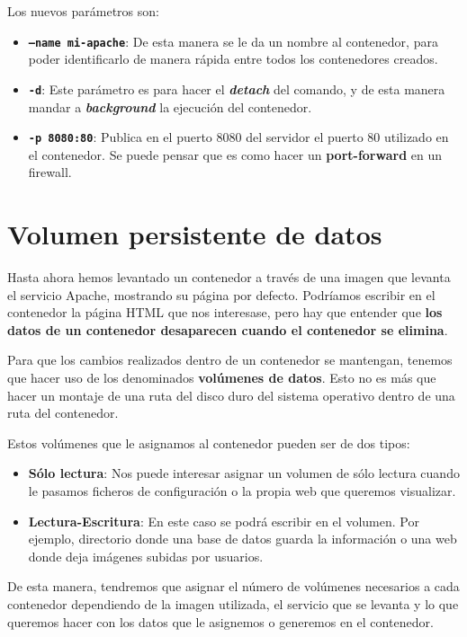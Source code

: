 Los nuevos parámetros son:
\begin{itemize}
    \item \textbf{\texttt{--name mi-apache}}: De esta manera se le da un nombre al contenedor, para poder identificarlo de manera rápida entre todos los contenedores creados.
    \item \textbf{\texttt{-d}}: Este parámetro es para hacer el \textbf{\textit{detach}} del comando, y de esta manera mandar a \textbf{\textit{background}} la ejecución del contenedor.
    \item \textbf{\texttt{-p 8080:80}}: Publica en el puerto 8080 del servidor el puerto 80 utilizado en el contenedor. Se puede pensar que es como hacer un \textbf{port-forward} en un firewall.
\end{itemize}


\hypertarget{volumen_persistente_datos}{}
\section{Volumen persistente de datos}
Hasta ahora hemos levantado un contenedor a través de una imagen que levanta el servicio Apache, mostrando su página por defecto. Podríamos escribir en el contenedor la página HTML que nos interesase, pero hay que entender que \textbf{los datos de un contenedor desaparecen cuando el contenedor se elimina}.

Para que los cambios realizados dentro de un contenedor se mantengan, tenemos que hacer uso de los denominados \textbf{volúmenes de datos}. Esto no es más que hacer un montaje de una ruta del disco duro del sistema operativo dentro de una ruta del contenedor.


Estos volúmenes que le asignamos al contenedor pueden ser de dos tipos:
\begin{itemize}
    \item \textbf{Sólo lectura}: Nos puede interesar asignar un volumen de sólo lectura cuando le pasamos ficheros de configuración o la propia web que queremos visualizar.
    \item \textbf{Lectura-Escritura}: En este caso se podrá escribir en el volumen. Por ejemplo, directorio donde una base de datos guarda la información o una web donde deja imágenes subidas por usuarios.
\end{itemize}

De esta manera, tendremos que asignar el número de volúmenes necesarios a cada contenedor dependiendo de la imagen utilizada, el servicio que se levanta y lo que queremos hacer con los datos que le asignemos o generemos en el contenedor.

